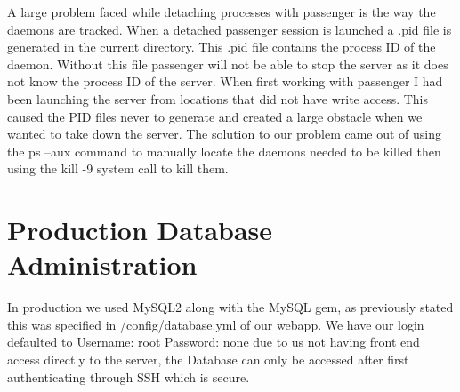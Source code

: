 A large problem faced while detaching processes with passenger is the way the daemons are tracked.  When a detached passenger session is launched a .pid file is generated in the current directory.  This .pid file contains the process ID of the daemon.  Without this file passenger will not be able to stop the server as it does not know the process ID of the server.  When first working with passenger I had been launching the server from locations that did not have write access.  This caused the PID files never to generate and created a large obstacle when we wanted to take down the server.  The solution to our problem came out of using the ps –aux command to manually locate the daemons needed to be killed then using the kill -9 system call to kill them.


\section{Production Database Administration}

In production we used MySQL2 along with the MySQL gem, as previously stated this was specified in /config/database.yml of our webapp. We have our login defaulted to Username: root Password: none due to us not having front end access directly to the server, the Database can only be accessed after first authenticating through SSH which is secure. 
